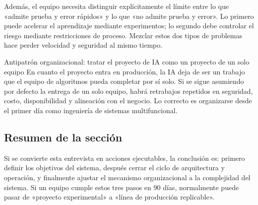 Además, el equipo necesita distinguir explícitamente el límite entre lo que «admite prueba y error rápidos» y lo que «no admite prueba y error». Lo primero puede acelerar el aprendizaje mediante experimentos; lo segundo debe controlar el riesgo mediante restricciones de proceso. Mezclar estos dos tipos de problemas hace perder velocidad y seguridad al mismo tiempo.

\begin{warningbox}{Antipatrón organizacional: tratar el proyecto de IA como un proyecto de un solo equipo}
En cuanto el proyecto entra en producción, la IA deja de ser un trabajo que el equipo de algoritmos pueda completar por sí solo. Si se sigue asumiendo por defecto la entrega de un solo equipo, habrá retrabajos repetidos en seguridad, costo, disponibilidad y alineación con el negocio. Lo correcto es organizarse desde el primer día como ingeniería de sistemas multifuncional.
\end{warningbox}

\subsection{Resumen de la sección}

Si se convierte esta entrevista en acciones ejecutables, la conclusión es: primero definir los objetivos del sistema, después cerrar el ciclo de arquitectura y operación, y finalmente ajustar el mecanismo organizacional a la complejidad del sistema. Si un equipo cumple estos tres pasos en 90 días, normalmente puede pasar de «proyecto experimental» a «línea de producción replicable».
